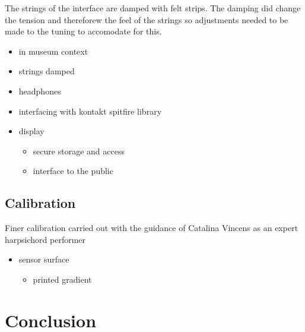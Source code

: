 The strings of the interface are damped with felt strips. The damping
did change the tension and thereforew the feel of the strings so
adjustments needed to be made to the tuning to accomodate for this.

\begin{itemize}
\item
  in museum context
\item
  strings damped
\item
  headphones
\item
  interfacing with kontakt spitfire library
\item
  display

  \begin{itemize}
  \item
    secure storage and access
  \item
    interface to the public
  \end{itemize}
\end{itemize}

\subsection{Calibration}\label{calibration}

Finer calibration carried out with the guidance of Catalina Vincens as
an expert harpsichord performer

\begin{itemize}
\item
  sensor surface

  \begin{itemize}
  \item
    printed gradient
  \end{itemize}
\end{itemize}

\section{Conclusion}\label{conclusion}

